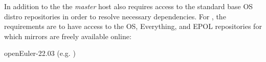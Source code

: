In addition to the \OHPC{} 
\iftoggle{isxCAT}{and \xCAT{} package repositories,}{package repository,}
the {\em master} host also requires access to the standard base OS distro
repositories in order to resolve necessary dependencies. For \baseOS{}, the
requirements are to have access to the OS, Everything,
and EPOL repositories for which mirrors are freely available online:

\begin{itemize*}
\item openEuler-22.03
  (e.g. \href{https://repo.openeuler.org/openEuler-22.03-LTS/}
             {\color{blue}{https://repo.openeuler.org/openEuler-22.03-LTS/}} )
\end{itemize*}
